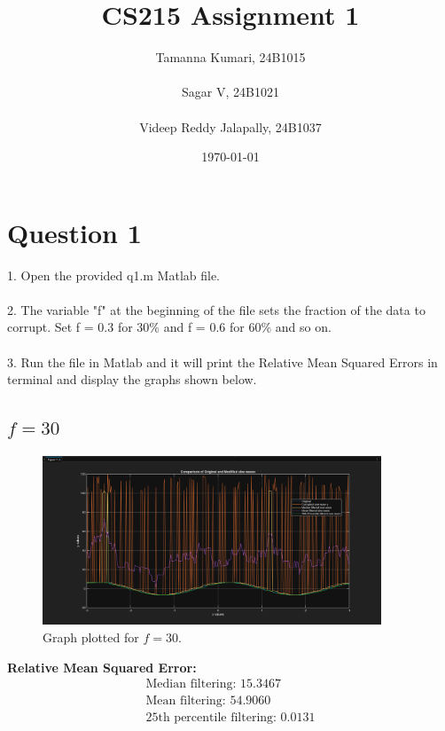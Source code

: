 \documentclass{report}
\title{\Huge CS215 Assignment 1}
\author{Tamanna Kumari, 24B1015
\\\\Sagar V, 24B1021
\\\\Videep Reddy Jalapally, 24B1037}
\date{\today}
\begin{document}
\maketitle
\tableofcontents
\newpage

\section*{Question 1}


\begin{tcolorbox}[colback=blue!5!white,colframe=blue!50!black,title=\textbf{Steps to Run}]
1. Open the provided q1.m Matlab file. \\
\\
2. The variable "f" at the beginning of the file sets the fraction of the data to corrupt. Set f = 0.3 for 30\% and f = 0.6 for 60\% and so on.\\
\\
3. Run the file in Matlab and it will print the Relative Mean Squared Errors in terminal and display the graphs shown below.
\end{tcolorbox}

\subsection*{$f = 30$}

\begin{figure}[h]
    \centering
    \includegraphics[width=0.9\textwidth]{f30_filtered.png}
    \caption{Graph plotted for $f = 30$.}
    \label{fig:f30}
\end{figure}

\vspace{1em} %
\noindent\textbf{Relative Mean Squared Error:}
\begin{align*}
\text{Median filtering: } 15.3467 \\
\text{Mean filtering: } 54.9060 \\
\text{25th percentile filtering: } 0.0131
\end{align*}\\
\end{document}
